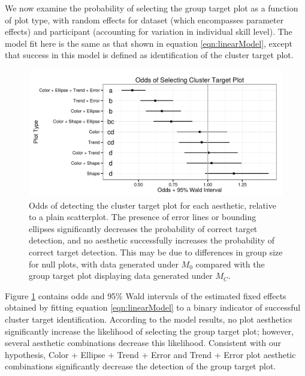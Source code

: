 \documentclass[11pt]{isuthesis}\usepackage[]{graphicx}\usepackage[]{color}
\newenvironment{knitrout}{}{} %
\begin{document}
We now examine the probability of selecting the group target plot as a function of plot type, with random effects for dataset (which encompasses parameter effects) and participant (accounting for variation in individual skill level). The model fit here is the same as that shown in equation \eqref{eqn:linearModel}, except that success in this model is defined as identification of the cluster target plot. 

\begin{figure}[ht]\centering
\begin{knitrout}
\color{fgcolor}

{\centering \includegraphics[width=.75\linewidth]{Figure/FeatureHierarchy/fig-group-fixef-1} 

}



\end{knitrout}
\caption[Odds of detecting the cluster target plot for each aesthetic]{Odds of detecting the cluster target plot for each aesthetic, relative to a plain scatterplot. The presence of error lines or bounding ellipses significantly decreases the probability of correct target detection, and no aesthetic successfully increases the probability of correct target detection. This may be due to differences in group size for null plots, with data generated under $M_0$ compared with the group target plot displaying data generated under $M_C$. \label{fig:group.fixef}}
\end{figure}

Figure \ref{fig:group.fixef} contains odds and 95\% Wald intervals of the estimated fixed effects obtained by fitting equation \ref{eqn:linearModel} to a binary indicator of successful cluster target identification. 
According to the model results, no plot aesthetics significantly increase the likelihood of selecting the group target plot; however, several aesthetic combinations decrease this likelihood. Consistent with our hypothesis,  Color + Ellipse + Trend + Error and Trend + Error plot aesthetic combinations significantly decrease the detection of the group target plot. 
\end{document}
